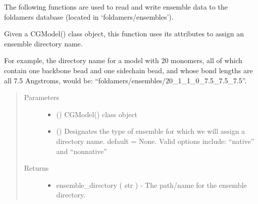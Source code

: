 \documentclass[letterpaper,12pt,english,openany,oneside]{sphinxmanual}
\begin{document}
The following functions are used to read and write ensemble data to the foldamers database (located in ‘foldamers/ensembles’).

\label{\detokenize{ensembles:module-ensembles.ens_build}}

\begin{fulllineitems}
\label{\detokenize{ensembles:ensembles.ens_build.get_ensemble_directory}}
Given a CGModel() class object, this function uses its attributes to assign an ensemble directory name.

For example, the directory name for a model with 20 monomers, all of which contain one backbone bead and one sidechain bead, and whose bond lengths are all 7.5 Angstroms, would be: “foldamers/ensembles/20\_1\_1\_0\_7.5\_7.5\_7.5”.
\begin{quote}\begin{description}
\item[{Parameters}] \leavevmode\begin{itemize}
\item {} 
 () \textendash{} CGModel() class object

\item {} 
 () \textendash{} Designates the type of ensemble for which we will assign a directory name.  default = None.  Valid options include: “native” and “nonnative”

\end{itemize}

\item[{Returns}] \leavevmode
\begin{itemize}
\item {} 
ensemble\_directory ( str ) - The path/name for the ensemble directory.

\end{itemize}


\end{description}\end{quote}

\end{fulllineitems}
\end{document}
